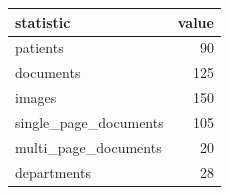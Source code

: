 \begin{tabular}{lr}
\toprule
statistic & value \\
\midrule
patients & 90 \\
documents & 125 \\
images & 150 \\
single\_page\_documents & 105 \\
multi\_page\_documents & 20 \\
departments & 28 \\
\bottomrule
\end{tabular}
